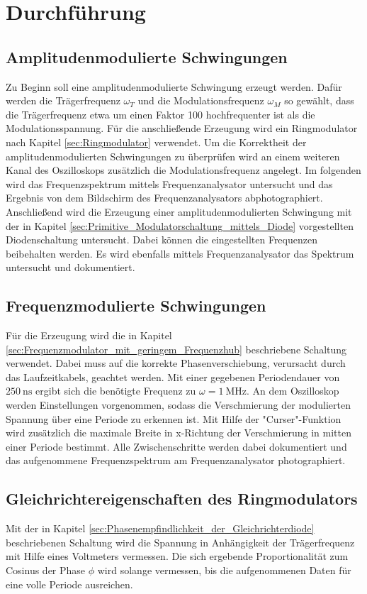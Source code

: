 \section{Durchführung}
\label{sec:Durchführung}

\subsection{Amplitudenmodulierte Schwingungen}
Zu Beginn soll eine amplitudenmodulierte Schwingung erzeugt werden. Dafür werden die Trägerfrequenz $\omega_T$ und die Modulationsfrequenz $\omega_M$ so gewählt, dass die Trägerfrequenz etwa um einen Faktor 100 hochfrequenter ist als die Modulationsspannung. Für die anschließende Erzeugung wird ein Ringmodulator nach Kapitel \ref{sec:Ringmodulator} verwendet. Um die Korrektheit der amplitudenmodulierten Schwingungen zu überprüfen wird an einem weiteren Kanal des Oszilloskops zusätzlich die Modulationsfrequenz angelegt. Im folgenden wird das Frequenzspektrum mittels Frequenzanalysator untersucht und das Ergebnis von dem Bildschirm des Frequenzanalysators abphotographiert.
\\

Anschließend wird die Erzeugung einer amplitudenmodulierten Schwingung mit der in Kapitel \ref{sec:Primitive_Modulatorschaltung_mittels_Diode} vorgestellten Diodenschaltung untersucht. Dabei können die eingestellten Frequenzen beibehalten werden. Es wird ebenfalls mittels Frequenzanalysator das Spektrum untersucht und dokumentiert.

\subsection{Frequenzmodulierte Schwingungen}
Für die Erzeugung wird die in Kapitel \ref{sec:Frequenzmodulator_mit_geringem_Frequenzhub} beschriebene Schaltung verwendet. Dabei muss auf die korrekte Phasenverschiebung, verursacht durch das Laufzeitkabels, geachtet werden. Mit einer gegebenen Periodendauer von $\SI{250}{\ns}$ ergibt sich die benötigte Frequenz zu $\omega=\SI{1}{\mega\hertz}$. An dem Oszilloskop werden Einstellungen vorgenommen, sodass die Verschmierung der modulierten Spannung über eine Periode zu erkennen ist. Mit Hilfe der "Curser"-Funktion wird zusätzlich die maximale Breite in x-Richtung der Verschmierung in mitten einer Periode bestimmt. Alle Zwischenschritte werden dabei dokumentiert und das aufgenommene Frequenzspektrum am Frequenzanalysator photographiert.

\subsection{Gleichrichtereigenschaften des Ringmodulators}
Mit der in Kapitel \ref{sec:Phasenempfindlichkeit_der_Gleichrichterdiode} beschriebenen Schaltung wird die Spannung in Anhängigkeit der Trägerfrequenz mit Hilfe eines Voltmeters vermessen. Die sich ergebende Proportionalität zum Cosinus der Phase $\phi$ wird solange vermessen, bis die aufgenommenen Daten für eine volle Periode ausreichen.


